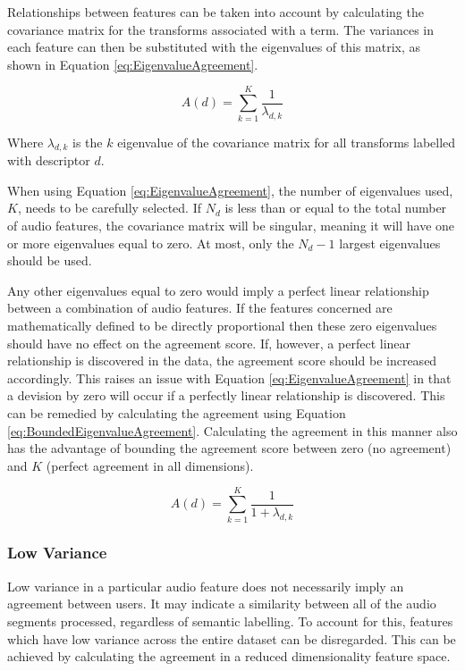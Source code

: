 			Relationships between features can be taken into account by calculating the covariance matrix for
			the transforms associated with a term. The variances in each feature can then be substituted with
			the eigenvalues of this matrix, as shown in Equation \ref{eq:EigenvalueAgreement}.

			\begin{equation}
				A(d) = \sum_{k = 1}^{K} \frac{1}{\lambda_{d,k}}
				\label{eq:EigenvalueAgreement}
			\end{equation}
			
			Where $\lambda_{d, k}$ is the $k$ eigenvalue of the covariance matrix for all transforms
			labelled with descriptor $d$.

			When using Equation \ref{eq:EigenvalueAgreement}, the number of eigenvalues used, $K$, needs to be
			carefully selected. If $N_{d}$ is less than or equal to the total number of audio features, the
			covariance matrix will be singular, meaning it will have one or more eigenvalues equal to zero. At
			most, only the $N_{d} - 1$ largest eigenvalues should be used.
			
			Any other eigenvalues equal to zero would imply a perfect linear relationship between a combination
			of audio features. If the features concerned are mathematically defined to be directly proportional
			then these zero eigenvalues should have no effect on the agreement score. If, however, a perfect
			linear relationship is discovered in the data, the agreement score should be increased
			accordingly. This raises an issue with Equation \ref{eq:EigenvalueAgreement} in that a devision by
			zero will occur if a perfectly linear relationship is discovered. This can be remedied by
			calculating the agreement using Equation \ref{eq:BoundedEigenvalueAgreement}. Calculating the
			agreement in this manner also has the advantage of bounding the agreement score between zero (no
			agreement) and $K$ (perfect agreement in all dimensions).

			\begin{equation}
				A(d) = \sum_{k = 1}^{K} \frac{1}{1 + \lambda_{d,k}}
				\label{eq:BoundedEigenvalueAgreement}
			\end{equation}

		\subsubsection*{Low Variance}
			Low variance in a particular audio feature does not necessarily imply an agreement between users.
			It may indicate a similarity between all of the audio segments processed, regardless of semantic
			labelling. To account for this, features which have low variance across the entire dataset can be
			disregarded. This can be achieved by calculating the agreement in a reduced dimensionality feature
			space.

